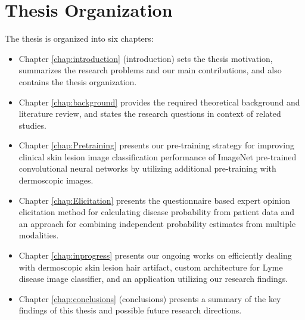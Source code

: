 \section{Thesis Organization}
The thesis is organized into six chapters:
\begin{itemize}
	
	\item Chapter \ref{chap:introduction}  (introduction) sets the thesis motivation, summarizes the research problems and our main contributions, and also contains the thesis organization.
	
	\item Chapter \ref{chap:background} provides the required theoretical background and literature review, and states the research questions in context of related studies.
	
	\item Chapter \ref{chap:Pretraining} presents our pre-training strategy for improving clinical skin lesion image classification performance of ImageNet pre-trained convolutional neural networks by utilizing additional pre-training with dermoscopic images.
	
	\item Chapter \ref{chap:Elicitation} presents the questionnaire based expert opinion elicitation method for calculating disease probability from patient data and an approach for combining independent probability estimates from multiple modalities. 
	
	\item Chapter \ref{chap:inprogress} presents our ongoing works on efficiently dealing with dermoscopic skin lesion hair artifact, custom architecture for Lyme disease image classifier, and an application utilizing our research findings.
	
	\item Chapter \ref{chap:conclusions} (conclusions) presents a summary of the key findings of this thesis and possible future research directions. 
	
\end{itemize}